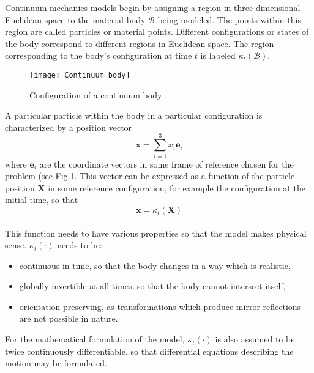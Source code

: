 Continuum mechanics models begin by assigning a region in three-dimensional Euclidean space to the material body $\mathcal{B}$ being modeled. The points within this region are called particles or material points. Different configurations or states of the body correspond to different regions in Euclidean space. The region corresponding to the body's configuration at time $t$ is labeled $\kappa_t(\mathcal{B})$.
\begin{figure}
\texttt{[image: Continuum\_body]}
\caption{Configuration of a continuum body}
\label{continuumbody}
\end{figure}

A particular particle within the body in a particular configuration is characterized by a position vector\\
\[\mathbf{x} = \sum_{i=1}^3x_i \mathbf{e}_i\]
where $\mathbf{e}_i$ are the coordinate vectors in some frame of reference chosen for the problem (see Fig.\ref{continuumbody}. This vector can be expressed as a function of the particle position $\mathbf{X}$ in some reference configuration, for example the configuration at the initial time, so that\\
\[\mathbf{x}=\kappa_t(\mathbf{X})\]\\
This function needs to have various properties so that the model makes physical sense. $\kappa_t(\cdot)$ needs to be:\\
\begin{itemize}
\item continuous in time, so that the body changes in a way which is realistic,
\item globally invertible at all times, so that the body cannot intersect itself,
\item orientation-preserving, as transformations which produce mirror reflections are not possible in nature.
\end{itemize}
For the mathematical formulation of the model, $\kappa_t(\cdot)$ is also assumed to be twice continuously differentiable, so that differential equations describing the motion may be formulated.

